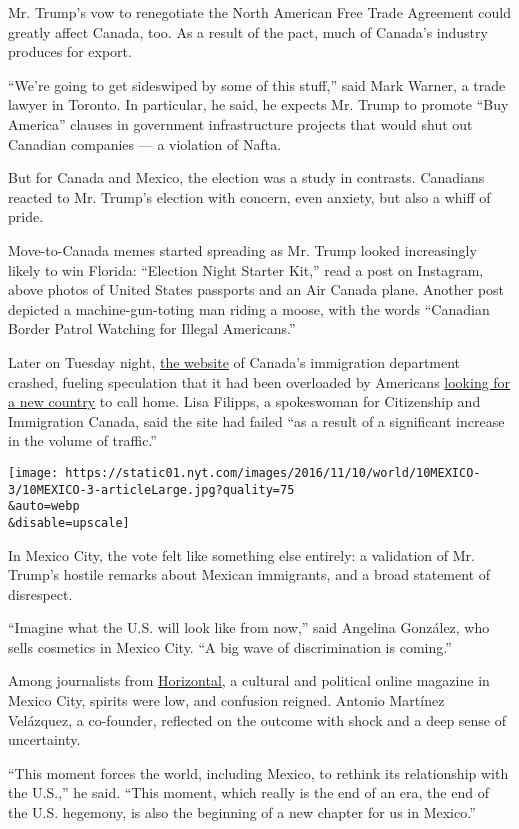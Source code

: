Mr. Trump's vow to renegotiate the North American Free Trade Agreement
could greatly affect Canada, too. As a result of the pact, much of
Canada's industry produces for export.

``We're going to get sideswiped by some of this stuff,'' said Mark
Warner, a trade lawyer in Toronto. In particular, he said, he expects
Mr. Trump to promote ``Buy America'' clauses in government
infrastructure projects that would shut out Canadian companies --- a
violation of Nafta.

But for Canada and Mexico, the election was a study in contrasts.
Canadians reacted to Mr. Trump's election with concern, even anxiety,
but also a whiff of pride.

Move-to-Canada memes started spreading as Mr. Trump looked increasingly
likely to win Florida: ``Election Night Starter Kit,'' read a post on
Instagram, above photos of United States passports and an Air Canada
plane. Another post depicted a machine-gun-toting man riding a moose,
with the words ``Canadian Border Patrol Watching for Illegal
Americans.''

Later on Tuesday night, \href{http://www.cic.gc.ca/}{the website} of
Canada's immigration department crashed, fueling speculation that it had
been overloaded by Americans
\href{http://www.nytimes.com/2016/11/10/us/-canada-immigration.html?src=twr}{looking
for a new country} to call home. Lisa Filipps, a spokeswoman for
Citizenship and Immigration Canada, said the site had failed ``as a
result of a significant increase in the volume of traffic.''

\texttt{[image: https://static01.nyt.com/images/2016/11/10/world/10MEXICO-3/10MEXICO-3-articleLarge.jpg?quality=75\\\&auto=webp\\\&disable=upscale]}

In Mexico City, the vote felt like something else entirely: a validation
of Mr. Trump's hostile remarks about Mexican immigrants, and a broad
statement of disrespect.

``Imagine what the U.S. will look like from now,'' said Angelina
González, who sells cosmetics in Mexico City. ``A big wave of
discrimination is coming.''

Among journalists from \href{http://horizontal.mx/}{Horizontal}, a
cultural and political online magazine in Mexico City, spirits were low,
and confusion reigned. Antonio Martínez Velázquez, a co-founder,
reflected on the outcome with shock and a deep sense of uncertainty.

``This moment forces the world, including Mexico, to rethink its
relationship with the U.S.,'' he said. ``This moment, which really is
the end of an era, the end of the U.S. hegemony, is also the beginning
of a new chapter for us in Mexico.''

